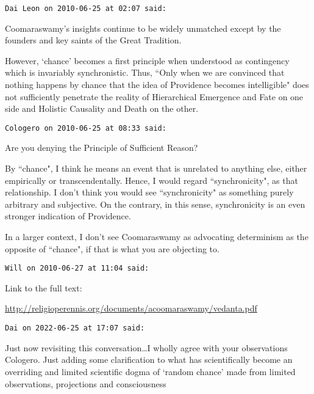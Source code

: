 \begin{footnotesize}\begin{sffamily}



\texttt{Dai Leon on 2010-06-25 at 02:07 said: }

Coomaraswamy's insights continue to be widely unmatched except by the founders and key saints of the Great Tradition.

However, `chance' becomes a first principle when understood as contingency which is invariably synchronistic. Thus, ``Only when we are convinced that nothing happens by chance that the idea of Providence becomes intelligible" does not sufficiently penetrate the reality of Hierarchical Emergence and Fate on one side and Holistic Causality and Death on the other.


\hfill

\texttt{Cologero on 2010-06-25 at 08:33 said: }

Are you denying the Principle of Sufficient Reason?

By ``chance", I think he means an event that is unrelated to anything else, either empirically or transcendentally. Hence, I would regard ``synchronicity", as that relationship. I don't think you would see ``synchronicity" as something purely arbitrary and subjective. On the contrary, in this sense, synchronicity is an even stronger indication of Providence.

In a larger context, I don't see Coomaraswamy as advocating determinism as the opposite of ``chance", if that is what you are objecting to.


\hfill

\texttt{Will on 2010-06-27 at 11:04 said: }

Link to the full text:

\url{http://religioperennis.org/documents/acoomaraswamy/vedanta.pdf}


\hfill

\texttt{Dai on 2022-06-25 at 17:07 said: }

Just now revisiting this conversation…I wholly agree with your observations Cologero. Just adding some clarification to what has scientifically become an overriding and limited scientific dogma of `random chance' made from limited observations, projections and consciousness


\end{sffamily}\end{footnotesize}
